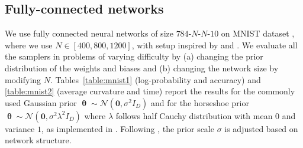 \documentclass[10pt]{article} %
\DeclareMathOperator{\btheta}{\boldsymbol{\theta}}
\theoremstyle{plain}
\theoremstyle{definition}
\theoremstyle{remark}
\begin{document}
\subsection{Fully-connected networks}

We use fully connected neural networks of size $784$-$N$-$N$-$10$ on MNIST dataset \citep{Lecun2010}, where we use $N \in [400, 800, 1200]$, with setup inspired by \citet{Li2016} and \citet{Korattikara2015}. We evaluate all the samplers in problems of varying difficulty by (a) changing the prior distribution of the weights and biases and (b) changing the network size by modifying $N$. Tables~\ref{table:mnist1} (log-probability and accuracy) and \ref{table:mnist2} (average curvature and time) report the results for the commonly used Gaussian prior $\btheta \sim \mathcal{N}(\boldsymbol{0}, \sigma^{2}I_{D})$ and for the horseshoe prior $\btheta \sim \mathcal{N}(\boldsymbol{0}, \sigma^2\lambda^{2}I_{D})$ where $\lambda$ follows half Cauchy distribution with mean $0$ and variance $1$, as implemented in \citet{Fortuin2021}. Following \citet{Fortuin2022}, the prior scale $\sigma$ is adjusted based on network structure.
\end{document}
